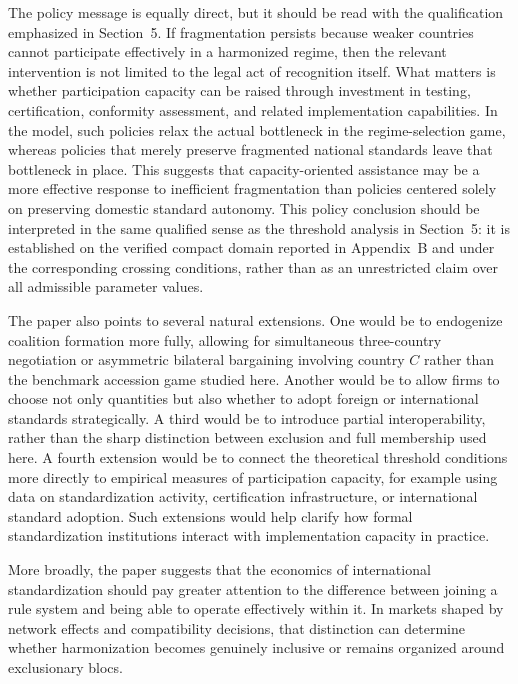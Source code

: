 The policy message is equally direct, but it should be read with the qualification emphasized in Section~5. If fragmentation persists because weaker countries cannot participate effectively in a harmonized regime, then the relevant intervention is not limited to the legal act of recognition itself. What matters is whether participation capacity can be raised through investment in testing, certification, conformity assessment, and related implementation capabilities. In the model, such policies relax the actual bottleneck in the regime-selection game, whereas policies that merely preserve fragmented national standards leave that bottleneck in place. This suggests that capacity-oriented assistance may be a more effective response to inefficient fragmentation than policies centered solely on preserving domestic standard autonomy.
This policy conclusion should be interpreted in the same qualified sense as
the threshold analysis in Section~5: it is established on the verified compact
domain reported in Appendix~B and under the corresponding crossing
conditions, rather than as an unrestricted claim over all admissible parameter
values.

The paper also points to several natural extensions. One would be to endogenize coalition formation more fully, allowing for simultaneous three-country negotiation or asymmetric bilateral bargaining involving country $C$ rather than the benchmark accession game studied here. Another would be to allow firms to choose not only quantities but also whether to adopt foreign or international standards strategically. A third would be to introduce partial interoperability, rather than the sharp distinction between exclusion and full membership used here. A fourth extension would be to connect the theoretical threshold conditions more directly to empirical measures of participation capacity, for example using data on standardization activity, certification infrastructure, or international standard adoption. Such extensions would help clarify how formal standardization institutions interact with implementation capacity in practice.

More broadly, the paper suggests that the economics of international standardization should pay greater attention to the difference between joining a rule system and being able to operate effectively within it. In markets shaped by network effects and compatibility decisions, that distinction can determine whether harmonization becomes genuinely inclusive or remains organized around exclusionary blocs.
